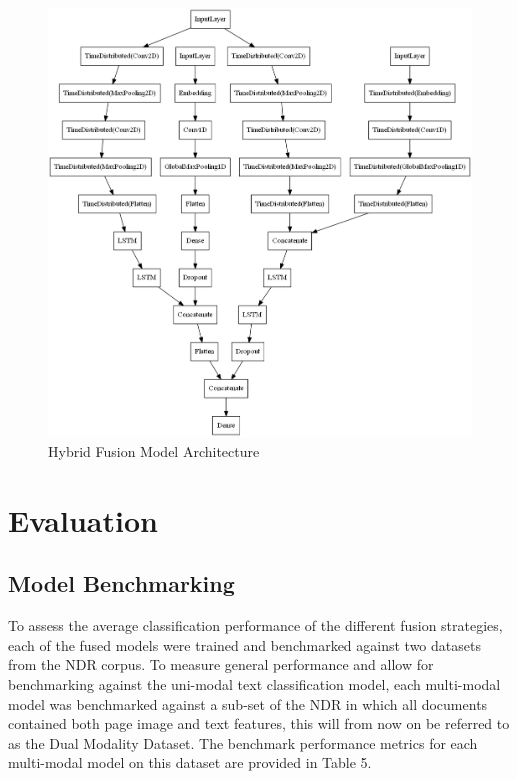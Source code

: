 \documentclass[a4paper,12pt]{article}
\begin{document}
\begin{figure}[H]
\caption{Hybrid Fusion Model Architecture}
\includegraphics[scale=0.35]{hybrid_fusion_model.png}
\centering
\end{figure}

\section{Evaluation}

\subsection{Model Benchmarking}
To assess the average classification performance of the different fusion strategies, each of the fused models were trained and benchmarked against two datasets from the NDR corpus. To measure general performance and allow for benchmarking against the uni-modal text classification model, each multi-modal model was benchmarked against a sub-set of the NDR in which all documents contained both page image and text features, this will from now on be referred to as the Dual Modality Dataset. The benchmark performance metrics for each multi-modal model on this dataset are provided in Table 5.\\
\end{document}
